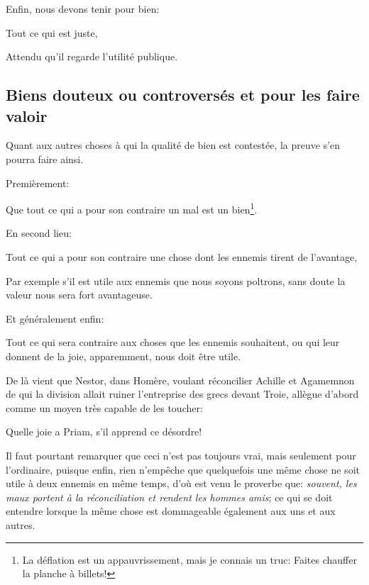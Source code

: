 \bigbreak

Enfin, nous devons tenir pour bien:

\begin{emphpar}
      Tout ce qui est juste,
\end{emphpar}

Attendu qu'il regarde l'utilité publique.

\subsection{Biens douteux ou controversés et pour les faire valoir}

Quant aux autres choses à qui la qualité de bien est contestée, la preuve s'en pourra faire ainsi.

\bigbreak

Premièrement:

\begin{emphpar}
      Que tout ce qui a pour son contraire un mal est un bien\footnote{La déflation est un appauvrissement, mais je
	  connais un truc: Faites chauffer la planche à billets!}. 
\end{emphpar}

En second lieu:

\begin{emphpar}
      Tout ce qui a pour son contraire une chose dont les ennemis tirent de l'avantage,
\end{emphpar}

Par exemple s'il est utile aux ennemis que nous soyons poltrons, sans doute la valeur nous sera fort avantageuse.

Et généralement enfin:

\begin{emphpar}
      Tout ce qui sera contraire aux choses que les ennemis souhaitent, ou qui leur donnent de la joie, apparemment,
	  nous doit être utile.
\end{emphpar}

De là vient que Nestor, dans Homère, voulant réconcilier Achille et Agamemnon de qui la division allait ruiner
l'entreprise des grecs devant Troie, allègue d'abord comme un moyen très capable de les toucher:

\begin{emphpar}
      Quelle joie a Priam, s'il apprend ce désordre!
\end{emphpar}

Il faut pourtant remarquer que ceci n'est pas toujours vrai, mais seulement pour l'ordinaire, puisque enfin, rien
n'empêche que quelquefois une même chose ne soit utile à deux ennemis en même temps, d'où est venu le proverbe que:
\emph{souvent, les maux portent à la réconciliation et rendent les hommes amis}; ce qui se doit entendre lorsque la
même chose est dommageable également aux uns et aux autres.

